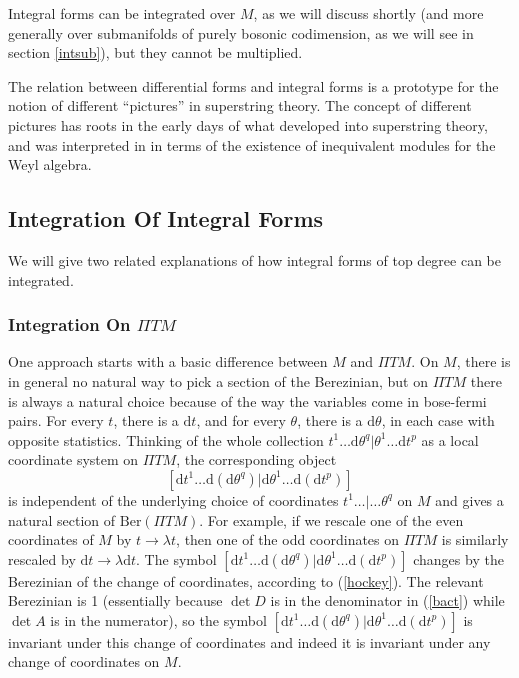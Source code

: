 \documentclass[11pt,a4paper]{article}
\def\d{{\mathrm d}}
\def\Ber{{\mathrm {Ber}}}
\def\Pi{\varPi}
\begin{document}
Integral forms can be integrated over $M$, as we will discuss shortly (and more generally over submanifolds of purely bosonic codimension, as we will
see in section \ref{intsub}), but they cannot be multiplied.

The relation between differential forms and integral forms is a prototype for the notion of different ``pictures'' in superstring theory.
The concept of different pictures has roots \cite{nst,bors}  in the early days of what developed into superstring theory, and was interpreted in
\cite{FMS} in terms of the existence of inequivalent modules for the Weyl algebra.

\subsection{Integration Of Integral Forms}\label{integintegral}

We will give two related explanations of how integral forms of top degree can be integrated.  

\subsubsection{Integration On ${\Pi} TM$}\label{pint}

One approach starts with a basic difference between $M$ and ${\Pi} TM$.   On $M$, there is  in general no natural
way to pick a section of the Berezinian, but on ${\Pi} TM$ there is always a natural choice because of the way the
variables come in bose-fermi pairs.  For every $t$, there is a $\d t$, and for every $\theta$, there is a $\d \theta$, in each case with
opposite statistics.  Thinking of the whole collection $t^1\dots\d\theta^q|\theta^1\dots\d t^p$ as a local coordinate system on ${\Pi} TM$, the 
corresponding object
\begin{equation}\label{doofus}  [\d t^1\dots \d(\d\theta^q)|\d\theta^1\dots \d(\d t^p)]  \end{equation}
is independent of the underlying choice of coordinates $t^1\dots|\dots\theta^q$ on $M$ and gives a natural section of $\Ber({\Pi} TM)$.   For example, if we rescale one of the even
coordinates of $M$  by $t\to \lambda t$, then one of the odd coordinates on ${\Pi} TM$ is similarly rescaled by $\d t\to \lambda \d t$.
The symbol $ [\d t^1\dots \d(\d\theta^q)|\d\theta^1\dots \d(\d t^p)] $ changes by the Berezinian of the change of coordinates,
according to (\ref{hockey}).  The relevant Berezinian is 1 (essentially because $\det D$ is in the denominator in (\ref{bact}) while $\det A$ is in the
numerator), so
the symbol $ [\d t^1\dots \d(\d\theta^q)|\d\theta^1\dots \d(\d t^p)] $ is invariant under this change of coordinates and indeed it is invariant
under any change of coordinates on $M$.  
\end{document}
